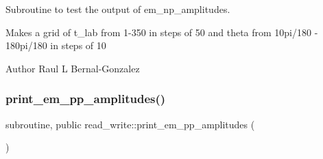 Subroutine to test the output of em\+\_\+np\+\_\+amplitudes. 

Makes a grid of t\+\_\+lab from 1-\/350 in steps of 50 and theta from 10pi/180 -\/ 180pi/180 in steps of 10

\begin{DoxyAuthor}{Author}
Raul L Bernal-\/\+Gonzalez 
\end{DoxyAuthor}
\mbox{\label{namespaceread__write_a72cf75ecd9db83c3514541af9b3bf5b6}} 
\subsubsection{\texorpdfstring{print\+\_\+em\+\_\+pp\+\_\+amplitudes()}{print\_em\_pp\_amplitudes()}}
{\footnotesize\ttfamily subroutine, public read\+\_\+write\+::print\+\_\+em\+\_\+pp\+\_\+amplitudes (\begin{DoxyParamCaption}{ }\end{DoxyParamCaption})}


